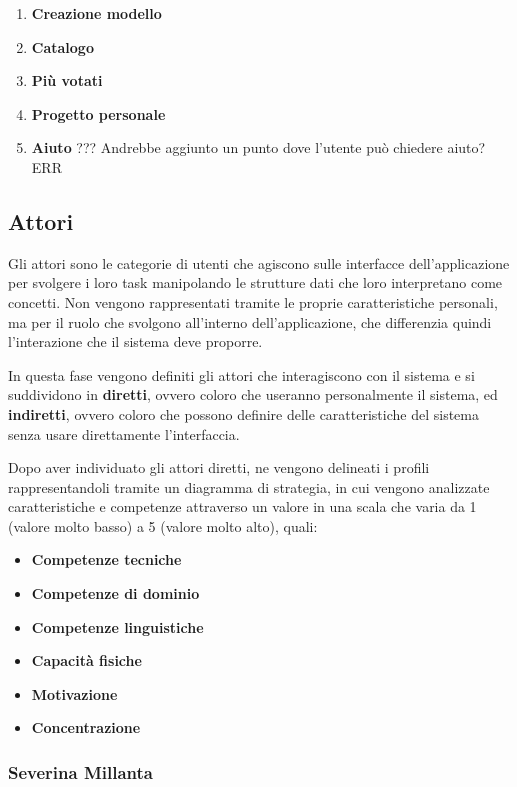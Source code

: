 \documentclass[12pt,italian,]{report}
\providecommand{\tightlist}{%
  \setlength{\itemsep}{0pt}\setlength{\parskip}{0pt}}
\begin{document}
\begin{enumerate}
\def\labelenumi{\arabic{enumi}.}
\tightlist
\item
  \textbf{Creazione modello}
\item
  \textbf{Catalogo}
\item
  \textbf{Più votati}
\item
  \textbf{Progetto personale}
\item
  \textbf{Aiuto} ??? Andrebbe aggiunto un punto dove l'utente può
  chiedere aiuto? ERR
\end{enumerate}

\hypertarget{attori}{%
\subsection{Attori}\label{attori}}

Gli attori sono le categorie di utenti che agiscono sulle interfacce
dell'applicazione per svolgere i loro task manipolando le strutture dati
che loro interpretano come concetti. Non vengono rappresentati tramite
le proprie caratteristiche personali, ma per il ruolo che svolgono
all'interno dell'applicazione, che differenzia quindi l'interazione che
il sistema deve proporre.

In questa fase vengono definiti gli attori che interagiscono con il
sistema e si suddividono in \textbf{diretti}, ovvero coloro che
useranno personalmente il sistema, ed \textbf{indiretti}, ovvero coloro
che possono definire delle caratteristiche del sistema senza usare
direttamente l'interfaccia.

Dopo aver individuato gli attori diretti, ne vengono delineati i profili
rappresentandoli tramite un diagramma di strategia, in cui vengono
analizzate caratteristiche e competenze attraverso un valore in una
scala che varia da 1 (valore molto basso) a 5 (valore molto alto),
quali:

\begin{itemize}
\tightlist
\item
  \textbf{Competenze tecniche}
\item
  \textbf{Competenze di dominio}
\item
  \textbf{Competenze linguistiche}
\item
  \textbf{Capacità fisiche}
\item
  \textbf{Motivazione}
\item
  \textbf{Concentrazione}
\end{itemize}

\hypertarget{severina-millanta-1}{%
\subsubsection{Severina Millanta}\label{severina-millanta-1}}
\end{document}
